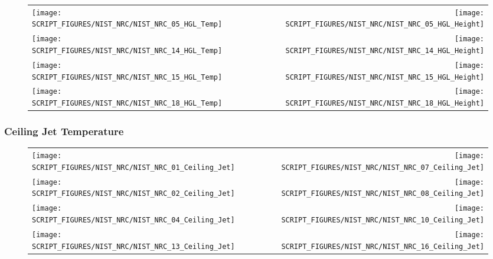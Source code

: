 \begin{figure}[!ht]
\begin{tabular*}{\textwidth}{l@{\extracolsep{\fill}}r}
\texttt{[image: SCRIPT\_FIGURES/NIST\_NRC/NIST\_NRC\_05\_HGL\_Temp]} &
\texttt{[image: SCRIPT\_FIGURES/NIST\_NRC/NIST\_NRC\_05\_HGL\_Height]} \\
\texttt{[image: SCRIPT\_FIGURES/NIST\_NRC/NIST\_NRC\_14\_HGL\_Temp]} &
\texttt{[image: SCRIPT\_FIGURES/NIST\_NRC/NIST\_NRC\_14\_HGL\_Height]} \\
\texttt{[image: SCRIPT\_FIGURES/NIST\_NRC/NIST\_NRC\_15\_HGL\_Temp]} &
\texttt{[image: SCRIPT\_FIGURES/NIST\_NRC/NIST\_NRC\_15\_HGL\_Height]} \\
\texttt{[image: SCRIPT\_FIGURES/NIST\_NRC/NIST\_NRC\_18\_HGL\_Temp]} &
\texttt{[image: SCRIPT\_FIGURES/NIST\_NRC/NIST\_NRC\_18\_HGL\_Height]}
\end{tabular*}
\end{figure}

\clearpage

\subsubsection{Ceiling Jet Temperature}

\begin{figure}[!ht]
\begin{tabular*}{\textwidth}{l@{\extracolsep{\fill}}r}
\texttt{[image: SCRIPT\_FIGURES/NIST\_NRC/NIST\_NRC\_01\_Ceiling\_Jet]} &
\texttt{[image: SCRIPT\_FIGURES/NIST\_NRC/NIST\_NRC\_07\_Ceiling\_Jet]} \\
\texttt{[image: SCRIPT\_FIGURES/NIST\_NRC/NIST\_NRC\_02\_Ceiling\_Jet]} &
\texttt{[image: SCRIPT\_FIGURES/NIST\_NRC/NIST\_NRC\_08\_Ceiling\_Jet]} \\
\texttt{[image: SCRIPT\_FIGURES/NIST\_NRC/NIST\_NRC\_04\_Ceiling\_Jet]} &
\texttt{[image: SCRIPT\_FIGURES/NIST\_NRC/NIST\_NRC\_10\_Ceiling\_Jet]} \\
\texttt{[image: SCRIPT\_FIGURES/NIST\_NRC/NIST\_NRC\_13\_Ceiling\_Jet]} &
\texttt{[image: SCRIPT\_FIGURES/NIST\_NRC/NIST\_NRC\_16\_Ceiling\_Jet]}
\end{tabular*}
\label{NIST_NRC_Jet_Closed}
\end{figure}

